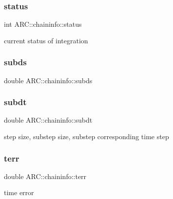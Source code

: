 \subsubsection{\texorpdfstring{status}{status}}
{\footnotesize\ttfamily int A\+R\+C\+::chaininfo\+::status}



current status of integration 

\hypertarget{classARC_1_1chaininfo_a3185aadb946f5d958016a35f40d0341f}{}\label{classARC_1_1chaininfo_a3185aadb946f5d958016a35f40d0341f} 
\subsubsection{\texorpdfstring{subds}{subds}}
{\footnotesize\ttfamily double A\+R\+C\+::chaininfo\+::subds}

\hypertarget{classARC_1_1chaininfo_a470e18cf65e805ff41ea3098da9cdd10}{}\label{classARC_1_1chaininfo_a470e18cf65e805ff41ea3098da9cdd10} 
\subsubsection{\texorpdfstring{subdt}{subdt}}
{\footnotesize\ttfamily double A\+R\+C\+::chaininfo\+::subdt}



step size, substep size, substep corresponding time step 

\hypertarget{classARC_1_1chaininfo_a665c9bc8dfdac9fdee4947e8aaffd8c6}{}\label{classARC_1_1chaininfo_a665c9bc8dfdac9fdee4947e8aaffd8c6} 
\subsubsection{\texorpdfstring{terr}{terr}}
{\footnotesize\ttfamily double A\+R\+C\+::chaininfo\+::terr}



time error 

\hypertarget{classARC_1_1chaininfo_a4c24552fe5d2005171233432f3cf3832}{}\label{classARC_1_1chaininfo_a4c24552fe5d2005171233432f3cf3832} 
